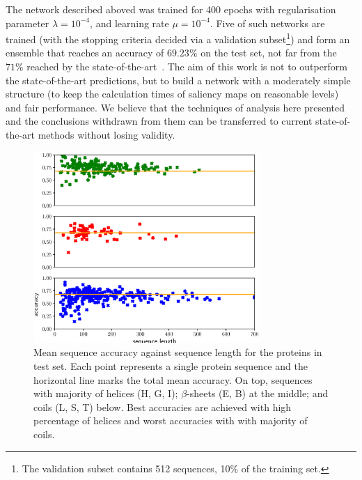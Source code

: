 \documentclass{article}
\begin{document}
The network described aboved was trained for 400 epochs with regularisation parameter $\lambda=10^{-4}$, and learning rate $\mu=10^{-4}$.
Five of such networks are trained (with the stopping criteria decided via a validation subset\footnote{The validation subset contains 512 sequences, 10\% of the training set.}) and form an ensemble that reaches an accuracy of $69.23\%$ on the test set, not far from the $71\%$ reached by the state-of-the-art~\cite{Busia2017}.
The aim of this work is not to outperform the state-of-the-art predictions, but to build a network with a moderately simple structure (to keep the calculation times of saliency maps on reasonable levels) and fair performance.
We believe that the techniques of analysis here presented and the conclusions withdrawn from them can be transferred to current state-of-the-art methods without losing validity.
\begin{figure}[t]
	\centering
	\centerline{\includegraphics[width=8.6cm]{per_seq_acc}}
	\caption{Mean sequence accuracy against sequence length for the proteins in test set.
		Each point represents a single protein sequence and the horizontal line marks the total mean accuracy.
		On top, sequences with majority of helices (H, G, I); $\beta$-sheets (E, B) at the middle; and coils (L, S, T) below.
		Best accuracies are achieved with high percentage of helices and worst accuracies with with majority of coils.}
	\label{fig:accuracies}
\end{figure}
\end{document}
